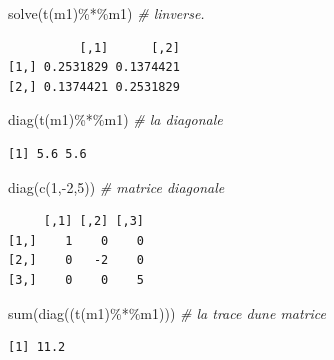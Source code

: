 \documentclass[
  8pt,
  ignorenonframetext,
]{beamer}
\newenvironment{Shaded}{\begin{snugshade}}{\end{snugshade}}
\newcommand{\CommentTok}[1]{\textcolor[rgb]{0.56,0.35,0.01}{\textit{#1}}}
\newcommand{\DecValTok}[1]{\textcolor[rgb]{0.00,0.00,0.81}{#1}}
\newcommand{\FunctionTok}[1]{\textcolor[rgb]{0.00,0.00,0.00}{#1}}
\newcommand{\NormalTok}[1]{#1}
\newcommand{\SpecialCharTok}[1]{\textcolor[rgb]{0.00,0.00,0.00}{#1}}
\begin{document}
\begin{frame}[fragile]{}
\protect\hypertarget{section-4}{}
\begin{Shaded}
\begin{Highlighting}[]
\FunctionTok{solve}\NormalTok{(}\FunctionTok{t}\NormalTok{(m1)}\SpecialCharTok{\%*\%}\NormalTok{m1)  }\CommentTok{\# l\textquotesingle{}inverse.}
\end{Highlighting}
\end{Shaded}

\begin{verbatim}
          [,1]      [,2]
[1,] 0.2531829 0.1374421
[2,] 0.1374421 0.2531829
\end{verbatim}

\begin{Shaded}
\begin{Highlighting}[]
\FunctionTok{diag}\NormalTok{(}\FunctionTok{t}\NormalTok{(m1)}\SpecialCharTok{\%*\%}\NormalTok{m1)   }\CommentTok{\# la diagonale}
\end{Highlighting}
\end{Shaded}

\begin{verbatim}
[1] 5.6 5.6
\end{verbatim}

\begin{Shaded}
\begin{Highlighting}[]
\FunctionTok{diag}\NormalTok{(}\FunctionTok{c}\NormalTok{(}\DecValTok{1}\NormalTok{,}\SpecialCharTok{{-}}\DecValTok{2}\NormalTok{,}\DecValTok{5}\NormalTok{))    }\CommentTok{\# matrice diagonale}
\end{Highlighting}
\end{Shaded}

\begin{verbatim}
     [,1] [,2] [,3]
[1,]    1    0    0
[2,]    0   -2    0
[3,]    0    0    5
\end{verbatim}

\begin{Shaded}
\begin{Highlighting}[]
\FunctionTok{sum}\NormalTok{(}\FunctionTok{diag}\NormalTok{((}\FunctionTok{t}\NormalTok{(m1)}\SpecialCharTok{\%*\%}\NormalTok{m1)))  }\CommentTok{\# la trace d\textquotesingle{}une matrice}
\end{Highlighting}
\end{Shaded}

\begin{verbatim}
[1] 11.2
\end{verbatim}
\end{frame}
\end{document}
